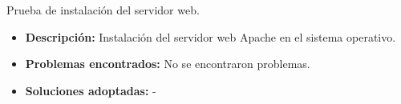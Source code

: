 \item Prueba de instalación del servidor web.
  \begin{itemize}
    \item \textbf{Descripción:} Instalación del servidor web Apache en el
    sistema operativo.
    \item \textbf{Problemas encontrados:} No se encontraron problemas.
    \item \textbf{Soluciones adoptadas:} -
  \end{itemize}

